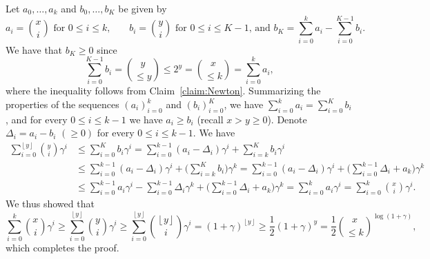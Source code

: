 \documentclass[11pt]{article}
\makeatletter
\renewenvironment{proof}[1][\proofname]
{\par\pushQED{\qed}
	\normalfont\topsep6\p@\@plus6\p@\relax\trivlist
	\item[\hskip\labelsep\bfseries#1\@addpunct{.}]
	\ignorespaces}
{\popQED\endtrivlist\@endpefalse}
\newcommand{\floor}[1]{\left\lfloor{#1}\right\rfloor}
\newcommand{\g}{\gamma}
\newcommand{\D}{\Delta}
\makeatother
\begin{document}
\begin{proof}[Proof of Lemma~\ref{lemma:113}]
	Let $a_0,\ldots,a_k$ and $b_0,\ldots,b_{K}$ be given by %
	$$a_i = \binom{x}{i}\text{ for $0 \le i \le k$,}\qquad b_i = \binom{y}{i} \text{ for $0 \le i \le K-1$, and $b_K=\sum_{i=0}^k a_i - \sum_{i=0}^{K-1} b_i$}.$$
	We have that $b_K \ge 0$ since
	$$\sum_{i=0}^{K-1} b_i = \binom{y}{\le y} \le 2^y = \binom{x}{\le k} = \sum_{i=0}^k a_i,$$
	where the inequality follows from Claim~\ref{claim:Newton}.
	Summarizing the properties of the sequences $(a_i)_{i=0}^k$ and $(b_i)_{i=0}^K$, we have $\sum_{i=0}^k a_i = \sum_{i=0}^{K} b_i$, and for every $0 \le i \le k-1$ we have $a_i \ge b_i$ (recall $x > y \ge 0$). 
	Denote $\D_i = a_i-b_i$ $(\ge 0)$ for every $0 \le i \le k-1$.
	We have 
	\begin{align*}
	\sum_{i=0}^{\floor y} \binom{y}{i}\g^i &\le \sum_{i=0}^K b_i \g^i = \sum_{i=0}^{k-1} (a_i-\D_i)\g^i + \sum_{i=k}^K b_i\g^i\\ 
	&\le \sum_{i=0}^{k-1} (a_i-\D_i)\g^i + \Big(\sum_{i=k}^K b_i\Big)\g^k
	= \sum_{i=0}^{k-1} (a_i-\D_i)\g^i + \Big(\sum_{i=0}^{k-1} \D_i + a_k\Big)\g^k\\
	&\le \sum_{i=0}^{k-1} a_i\g^i -\sum_{i=0}^{k-1}\D_i\g^k + \Big(\sum_{i=0}^{k-1} \D_i + a_k\Big)\g^k
	= \sum_{i=0}^k a_i \g^i = \sum_{i=0}^k \binom{x}{i} \g^i.
	\end{align*}
	We thus showed that
	$$\sum_{i=0}^k \binom{x}{i}\g^i \ge 
\sum_{i=0}^{\floor y} \binom{y}{i} \g^i \geq
	\sum_{i=0}^{\floor{y}} \binom{\floor{y}}{i} \g^i = (1+\g)^{\floor{y}}
	\geq  \frac12(1+\g)^{y} = \frac12\binom{x}{\le k}^{\log(1+\g)},$$
	which completes the proof.
\end{proof}
\end{document}
